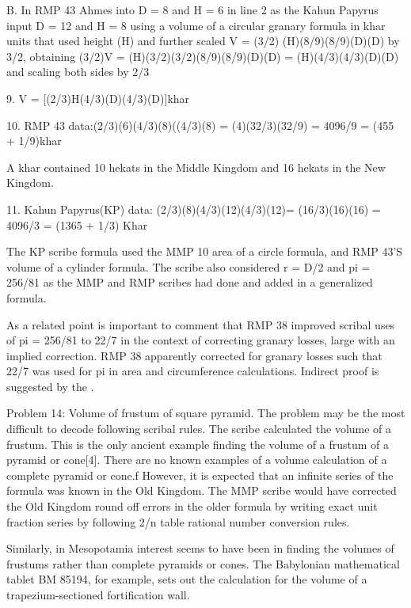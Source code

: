\documentclass[12pt]{article}
\begin{document}
B. In RMP 43 Ahmes into D = 8 and H = 6 in line 2 as the Kahun Papyrus input D = 12 and H = 8 using a volume of a circular granary formula in khar units that used height (H) and further scaled V = (3/2) (H)(8/9)(8/9)(D)(D) by 3/2, obtaining (3/2)V = (H)(3/2)(3/2)(8/9)(8/9)(D)(D) = (H)(4/3)(4/3)(D)(D) and scaling both sides by 2/3

9. V = [(2/3)H(4/3)(D)(4/3)(D)]khar

10. RMP 43 data:(2/3)(6)(4/3)(8)((4/3)(8) = (4)(32/3)(32/9) = 4096/9 = (455 + 1/9)khar

A khar contained 10 hekats in the Middle Kingdom and 16 hekats in the New Kingdom.

11. Kahun Papyrus(KP) data: (2/3)(8)(4/3)(12)(4/3)(12)= (16/3)(16)(16) = 4096/3 = (1365 + 1/3) Khar

The KP scribe formula used the MMP 10 area of a circle formula, and RMP 43'S volume of a cylinder formula. The scribe also considered r = D/2 and pi = 256/81 as the MMP and RMP scribes had done
and added  in a generalized formula.

As a related point is important to comment that RMP 38 improved scribal uses of pi = 256/81 to 22/7 in the context of correcting granary losses, large with an implied correction. RMP 38 apparently corrected for granary losses such that 22/7 was used for pi in area and circumference calculations. Indirect proof is suggested by the . 

Problem 14: Volume of frustum of square pyramid. The problem may be the most difficult to decode following scribal rules. The scribe calculated the volume of a frustum. This is the only ancient example finding the volume of a frustum of a pyramid or cone[4]. There are no known examples of a volume calculation of a complete pyramid or cone.f However, it is expected that an infinite series of the formula was known in the Old Kingdom. The MMP scribe would have corrected the Old Kingdom round off errors in the older formula by writing exact unit fraction series by following 2/n table rational number conversion rules.
 
Similarly, in Mesopotamia interest seems to have been in finding the volumes of frustums rather than complete pyramids or cones. The Babylonian mathematical tablet BM 85194, for example, sets out the calculation for the volume of a trapezium-sectioned fortification wall.
\end{document}
